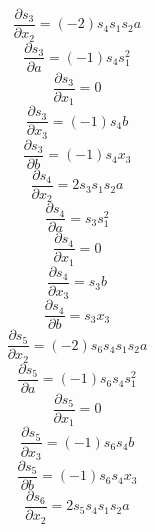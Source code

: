 \documentclass[10pt,a4paper]{article}
\begin{document}
\begin{dmath*}\frac{\partial s_{3}}{\partial x_{2}} = \left(-2\right)  s_{4}  s_{1}  s_{2}  a\end{dmath*}
\begin{dmath*}\frac{\partial s_{3}}{\partial a} = \left(-1\right)  s_{4}  s_{1} ^ {2}\end{dmath*}
\begin{dmath*}\frac{\partial s_{3}}{\partial x_{1}} = 0\end{dmath*}
\begin{dmath*}\frac{\partial s_{3}}{\partial x_{3}} = \left(-1\right)  s_{4}  b\end{dmath*}
\begin{dmath*}\frac{\partial s_{3}}{\partial b} = \left(-1\right)  s_{4}  x_{3}\end{dmath*}
\begin{dmath*}\frac{\partial s_{4}}{\partial x_{2}} = 2  s_{3}  s_{1}  s_{2}  a\end{dmath*}
\begin{dmath*}\frac{\partial s_{4}}{\partial a} = s_{3}  s_{1} ^ {2}\end{dmath*}
\begin{dmath*}\frac{\partial s_{4}}{\partial x_{1}} = 0\end{dmath*}
\begin{dmath*}\frac{\partial s_{4}}{\partial x_{3}} = s_{3}  b\end{dmath*}
\begin{dmath*}\frac{\partial s_{4}}{\partial b} = s_{3}  x_{3}\end{dmath*}
\begin{dmath*}\frac{\partial s_{5}}{\partial x_{2}} = \left(-2\right)  s_{6}  s_{4}  s_{1}  s_{2}  a\end{dmath*}
\begin{dmath*}\frac{\partial s_{5}}{\partial a} = \left(-1\right)  s_{6}  s_{4}  s_{1} ^ {2}\end{dmath*}
\begin{dmath*}\frac{\partial s_{5}}{\partial x_{1}} = 0\end{dmath*}
\begin{dmath*}\frac{\partial s_{5}}{\partial x_{3}} = \left(-1\right)  s_{6}  s_{4}  b\end{dmath*}
\begin{dmath*}\frac{\partial s_{5}}{\partial b} = \left(-1\right)  s_{6}  s_{4}  x_{3}\end{dmath*}
\begin{dmath*}\frac{\partial s_{6}}{\partial x_{2}} = 2  s_{5}  s_{4}  s_{1}  s_{2}  a\end{dmath*}
\end{document}
